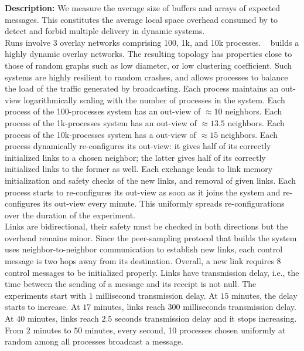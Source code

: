 \noindent \textbf{Description:} We measure the average size of buffers and
arrays of expected messages. This constitutes the average local space overhead
consumed by \RPCBROADCAST to detect and forbid multiple delivery in dynamic
systems.\\
Runs involve 3 overlay networks comprising 100, 1k, and 10k
processes. \SPRAY~\cite{nedelec2017adaptive} builds a highly dynamic overlay
networks. The resulting topology has properties close to those of random graphs
such as low diameter, or low clustering coefficient. Such systems are highly
resilient to random crashes, and allows processes to balance the load of the
traffic generated by broadcasting.  Each process maintains an out-view
logarithmically scaling with the number of processes in the system. Each process
of the 100-processes system has an out-view of $\approx 10$ neighbors. Each
process of the 1k-processes system has an out-view of $\approx 13.5$
neighbors. Each process of the 10k-processes system has a out-view of
$\approx 15$ neighbors.  Each process dynamically re-configures its out-view: it
gives half of its correctly initialized links to a chosen neighbor; the latter
gives half of its correctly initialized links to the former as well. Each
exchange leads to link memory initialization and safety checks of the new links,
and removal of given links. Each process starts to re-configures its out-view as
soon as it joins the system and re-configures its out-view every minute. This
uniformly spreads re-configurations over the duration of the
experiment.\\
Links are bidirectional, their safety must be checked in both directions but the
overhead remains minor. Since the peer-sampling protocol that builds the system
uses neighbor-to-neighbor communication to establish new links, each control
message is two hops away from its destination. Overall, a new link requires 8
control messages to be initialized properly. Links have transmission delay,
i.e., the time between the sending of a message and its receipt is not null. The
experiments start with $1$ millisecond transmission delay. At $15$ minutes, the
delay starts to increase. At $17$ minutes, links reach $300$ milliseconds
transmission delay. At $40$ minutes,
links reach $2.5$ seconds transmission delay and it stops increasing.\\
From $2$ minutes to $50$ minutes, every second, 10 processes chosen uniformly at
random among all processes broadcast a message.

